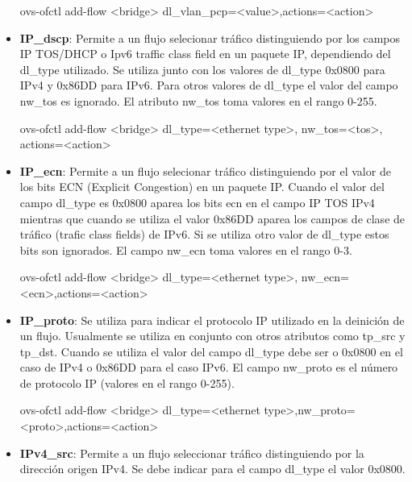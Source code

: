 \begin{itemize}
\begin{center}
ovs-ofctl add-flow <bridge> dl\_vlan\_pcp=<value>,actions=<action>
\end{center}

\item \textbf{IP\_dscp}: Permite a un flujo selecionar tr\'afico distinguiendo por los campos IP TOS/DHCP o Ipv6 traffic class field en un paquete IP, dependiendo del dl\_type utilizado. Se utiliza junto con los valores de dl\_type 0x0800 para IPv4 y 0x86DD para IPv6. Para otros valores de dl\_type el valor del campo nw\_tos es ignorado. El atributo nw\_tos toma valores en el rango 0-255.

\begin{center}
ovs-ofctl add-flow <bridge> dl\_type=<ethernet type>, nw\_tos=<tos>, actions=<action>
\end{center}

\item \textbf{IP\_ecn}: Permite a un flujo selecionar tr\'afico distinguiendo por el valor de los bits ECN (Explicit Congestion) en un paquete IP. Cuando el valor del campo dl\_type es 0x0800 aparea los bits ecn en el campo IP TOS IPv4 mientras que cuando se utiliza el valor 0x86DD aparea los campos de clase de tr\'afico (trafic class fields) de IPv6. Si se utiliza otro valor de dl\_type estos bits son ignorados. El campo nw\_ecn toma valores en el rango 0-3.

\begin{center}
ovs-ofctl add-flow <bridge> dl\_type=<ethernet type>, nw\_ecn=<ecn>,actions=<action>
\end{center}

\item \textbf{IP\_proto}: Se utiliza para indicar el protocolo IP utilizado en la deinici\'on de un flujo. Usualmente se utiliza en conjunto con otros atributos como tp\_src y tp\_dst. Cuando se utiliza el valor del campo dl\_type debe ser o 0x0800 en el caso de IPv4 o 0x86DD para el caso IPv6. El campo nw\_proto es el n\'umero de protocolo IP (valores en el rango 0-255).

\begin{center}
ovs-ofctl add-flow <bridge> dl\_type=<ethernet type>,nw\_proto=<proto>,actions=<action>
\end{center}

\item \textbf{IPv4\_src}: Permite a un flujo seleccionar tr\'afico distinguiendo por la dirección origen IPv4. Se debe indicar para el campo dl\_type el valor 0x0800.  


\end{itemize}
